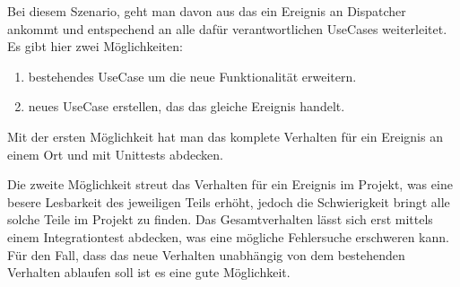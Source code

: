 
    Bei diesem Szenario, geht man davon aus das ein Ereignis an Dispatcher ankommt und entspechend an alle dafür 
    verantwortlichen UseCases weiterleitet. 
    Es gibt hier zwei Möglichkeiten:
    \begin{enumerate}
        \item bestehendes UseCase um die neue Funktionalität erweitern.
        \item neues UseCase erstellen, das das gleiche Ereignis handelt.
    \end{enumerate}

    Mit der ersten Möglichkeit hat man das komplete Verhalten für ein Ereignis an einem Ort und mit Unittests abdecken.

    Die zweite Möglichkeit streut das Verhalten für ein Ereignis im Projekt, was eine besere Lesbarkeit des jeweiligen Teils erhöht,
    jedoch die Schwierigkeit bringt alle solche Teile im Projekt zu finden. Das Gesamtverhalten lässt sich erst mittels
    einem Integrationtest abdecken, was eine mögliche Fehlersuche erschweren kann. 
    Für den Fall, dass das neue Verhalten unabhängig von dem bestehenden Verhalten ablaufen soll ist es eine gute Möglichkeit.